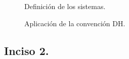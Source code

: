 \documentclass[a4paper,12pt]{article}
\begin{document}
\begin{figure}[H]
    \centering
    \begin{adjustbox}{scale = 0.85, max width=\columnwidth}
    \end{adjustbox}
    \caption{Definición de los sistemas.}
\end{figure}

\begin{figure}[H]
    \centering
    \begin{adjustbox}{scale = 0.85, max width=\columnwidth}
    \end{adjustbox}
    \caption{Aplicación de la convención DH.}
\end{figure}

\subsection{Inciso 2.}


\end{document}
